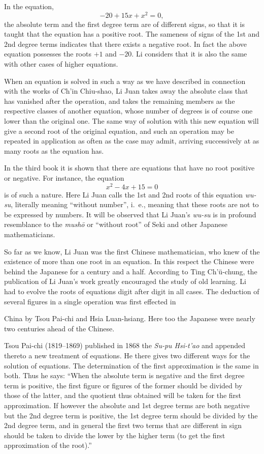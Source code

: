 \documentclass[11pt]{article}
\newcommand{\scanpage}[2]{\clearpage\setcounter{footnote}{0}\noindent{\footnotesize\color{gray}PDF page #1 · #2}\par\medskip}
\newcommand{\scanfooter}{}
\begin{document}
In the equation,
\[
-20+15x+x^2=0,
\]
the absolute term and the first degree term are of different signs, so that it is taught that the equation has a positive root. The sameness of signs of the 1st and 2nd degree terms indicates that there exists a negative root. In fact the above equation possesses the roots $+1$ and $-20$. Li considers that it is also the same with other cases of higher equations.

When an equation is solved in such a way as we have described in connection with the works of Ch'in Chiu-shao, Li Juan takes away the absolute class that has vanished after the operation, and takes the remaining members as the respective classes of another equation, whose number of degrees is of course one lower than the original one. The same way of solution with this new equation will give a second root of the original equation, and such an operation may be repeated in application as often as the case may admit, arriving successively at as many roots as the equation has.

In the third book it is shown that there are equations that have no root positive or negative. For instance, the equation
\[
x^2-4x+15=0
\]
is of such a nature. Here Li Juan calls the 1st and 2nd roots of this equation \emph{wu-su}, literally meaning ``without number'', i.~e., meaning that these roots are not to be expressed by numbers. It will be observed that Li Juan's \emph{wu-su} is in profound resemblance to the \emph{mushō} or ``without root'' of Seki and other Japanese mathematicians.

So far as we know, Li Juan was the first Chinese mathematician, who knew of the existence of more than one root in an equation. In this respect the Chinese were behind the Japanese for a century and a half. According to Ting Ch'ü-chung, the publication of Li Juan's work greatly encouraged the study of old learning. Li had to evolve the roots of equations digit after digit in all cases. The deduction of several figures in a single operation was first effected in
\scanfooter

\scanpage{0144}{Chapter 19, printed page 130}
China by Tsou Pai-chi and Hsia Luan-hsiang. Here too the Japanese were nearly two centuries ahead of the Chinese.

Tsou Pai-chi (1819--1869) published in 1868 the \emph{Su-pu Hsi-t'ao} and appended thereto a new treatment of equations. He there gives two different ways for the solution of equations. The determination of the first approximation is the same in both. Thus he says: ``When the absolute term is negative and the first degree term is positive, the first figure or figures of the former should be divided by those of the latter, and the quotient thus obtained will be taken for the first approximation. If however the absolute and 1st degree terms are both negative but the 2nd degree term is positive, the 1st degree term should be divided by the 2nd degree term, and in general the first two terms that are different in sign should be taken to divide the lower by the higher term (to get the first approximation of the root).''
\end{document}
